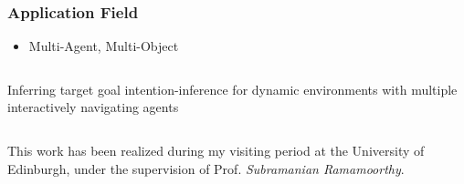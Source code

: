 \begin{frame}
	\frametitle{Application Field}
	
	\vspace{0.2cm}
	
	\begin{itemize}
		\item Multi-Agent, Multi-Object
	\end{itemize}
	
	\vspace{-0.45cm}
	
	\begin{columns}[t]
		{
			
			\begin{block}{Inferring target goal}
				intention-inference for dynamic environments with multiple interactively navigating agents
			\end{block}
			
		}
	\end{columns}
	
	\centering
	
	\begin{center}
	\end{center}
	
	\vspace{-0.3cm}
	
	\small
	This work has been realized during my visiting period at the University of Edinburgh, under the supervision of Prof. \emph{Subramanian Ramamoorthy}.
\end{frame}

